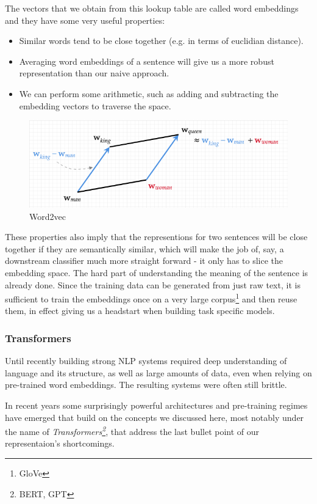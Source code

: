 The vectors that we obtain from this lookup table are called word embeddings and they have some very useful properties:
\begin{itemize}
    \item Similar words tend to be close together (e.g. in terms of euclidian distance).
    \item Averaging word embeddings of a sentence will give us a more robust representation than our naive approach.
    \item We can perform some arithmetic, such as adding and subtracting the embedding vectors to traverse the space.
\end{itemize}
\begin{figure}
  \includegraphics[width=\linewidth]{chapters/NLP/figures/king-man+woman.png}
  \caption{Word2vec}
  \label{fig:kingmanwoman}
\end{figure}
These properties also imply that the representions for two sentences will be close together if they are semantically similar, which will make the job of, say, a downstream classifier much more straight forward - it only has to slice the embedding space.
The hard part of understanding the meaning of the sentence is already done.
Since the training data can be generated from just raw text, it is sufficient to train the embeddings once on a very large corpus\footnote{GloVe} and then reuse them, in effect giving us a headstart when building task specific models.

\subsubsection{Transformers}
Until recently building strong NLP systems required deep understanding of language and its structure, as well as large amounts of data, even when relying on pre-trained word embeddings.
The resulting systems were often still brittle.

In recent years some surprisingly powerful architectures and pre-training regimes have emerged that build on the concepts we discussed here, most notably under the name of \textit{Transformers\footnote{BERT, GPT}}, that address the last bullet point of our representaion's shortcomings.

